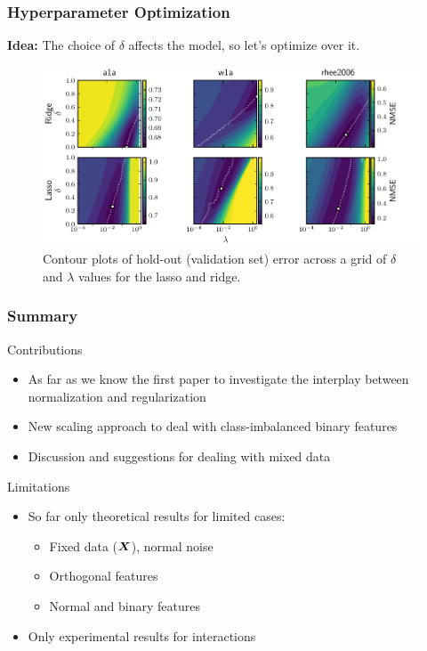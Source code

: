 \documentclass[10pt]{beamer}
\begin{document}
\begin{frame}[c]
  \frametitle{Hyperparameter Optimization}

  \textbf{Idea:} The choice of \(\delta\) affects the model, so let's optimize over it.

  \begin{figure}[htpb]
    \centering
    \includegraphics[width=\textwidth]{figures/paper6-hyperopt_surfaces.pdf}
    \caption{%
      Contour plots of hold-out (validation set) error across a grid of \(\delta\) and \(\lambda\) values for the
      lasso and ridge.
    }
  \end{figure}

\end{frame}

\begin{frame}[c]
  \frametitle{Summary}
  \begin{exampleblock}{Contributions}
    \begin{itemize}
      \item As far as we know the first paper to investigate the interplay between normalization and
            regularization
      \item New scaling approach to deal with class-imbalanced binary features
      \item Discussion and suggestions for dealing with mixed data
    \end{itemize}
  \end{exampleblock}

  \pause

  \begin{alertblock}{Limitations}
    \begin{itemize}
      \item So far only theoretical results for limited cases:
            \begin{itemize}
              \item Fixed data (\(\bm{X}\)), normal noise
              \item Orthogonal features
              \item Normal and binary features
            \end{itemize}
      \item Only experimental results for interactions
    \end{itemize}
  \end{alertblock}
\end{frame}
\end{document}
